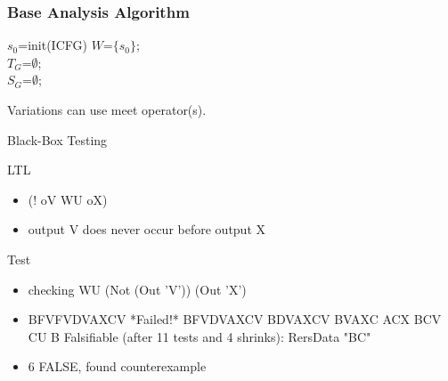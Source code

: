 \begin{frame}[fragile]
\frametitle{Base Analysis Algorithm}
{
\scriptsize
\begin{algorithm}[H]
\SetLine
{}

$s_0$=init(ICFG) 
$W$=$\{s_0\}$; \\
$T_G$=$\emptyset$; \\
$S_G$=$\emptyset$; \\
\label{alg:general}
\end{algorithm}
}
{
\footnotesize
Variations can use meet operator(s).
}
\end{frame}



\begin{frame}{Black-Box Testing}
\begin{block}{LTL}
\begin{itemize}
\item (! oV WU oX)
\item output V does never occur before output X
\end{itemize}
\end{block}

\begin{block}{Test}
\begin{itemize}

\item checking WU (Not (Out 'V')) (Out 'X')
\item  BFVFVDVAXCV *Failed!* BFVDVAXCV BDVAXCV BVAXC ACX BCV CU B Falsifiable (after 11 tests and 4 shrinks):  RersData "BC"
\item 6 FALSE, found counterexample
\end{itemize}
\end{block}

\end{frame}


